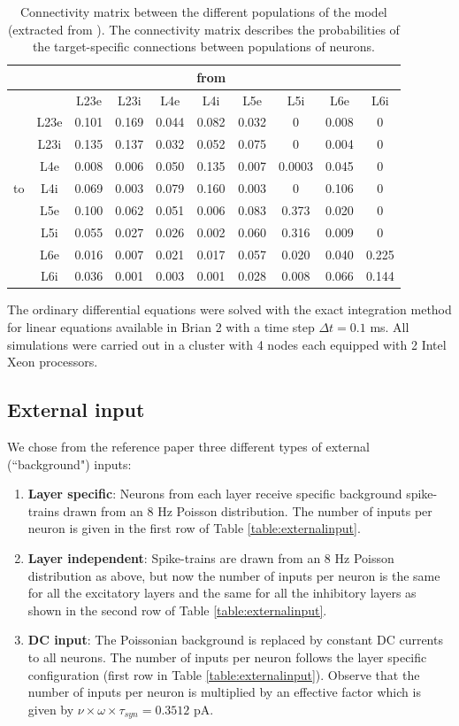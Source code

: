 \documentclass[10pt,a4paper,onecolumn]{article}
\begin{document}
\begin{table}[!ht]
\caption{\label{table:conectivity} Connectivity matrix between the different populations of the model (extracted from \cite{potjans2014}). The connectivity matrix describes the probabilities of the target-specific connections between populations of neurons.
}
\begin{center}
\begin{tabular}{lccccccccc}
 \toprule
 \midrule
 &  &  &  &  & from &  &  &  & \tabularnewline
  \midrule
 &  & L23e & L23i & L4e & L4i & L5e & L5i & L6e & L6i\tabularnewline
 \midrule
 & L23e & 0.101 & 0.169 & 0.044 & 0.082 & 0.032 & 0 & 0.008 & 0\tabularnewline
 & L23i & 0.135 & 0.137 & 0.032 & 0.052 & 0.075 & 0 & 0.004 & 0\tabularnewline
 & L4e & 0.008 & 0.006 & 0.050 & 0.135 & 0.007 & 0.0003 & 0.045 & 0\tabularnewline
 to & L4i & 0.069 & 0.003 & 0.079 & 0.160 & 0.003 & 0 & 0.106 & 0\tabularnewline
 & L5e & 0.100 & 0.062 & 0.051 & 0.006 & 0.083 & 0.373 & 0.020 & 0\tabularnewline
 & L5i & 0.055 & 0.027 & 0.026 & 0.002 & 0.060 & 0.316 & 0.009 & 0\tabularnewline
 & L6e & 0.016 & 0.007 & 0.021 & 0.017 & 0.057 & 0.020 & 0.040 & 0.225\tabularnewline
 & L6i & 0.036 & 0.001 & 0.003 & 0.001 & 0.028 & 0.008 & 0.066 & 0.144\tabularnewline
\bottomrule
\end{tabular}
\end{center}
\end{table}

The ordinary differential equations were solved with the exact integration method for linear equations available in Brian 2 with a time step $\Delta t=0.1$ ms. All simulations were carried out in a cluster with 4 nodes each equipped with 2 Intel Xeon processors. 

\subsection{External input}

We chose from the reference paper three different types of external (``background") inputs: 

\begin{enumerate}
\item \textbf{Layer specific}: Neurons from each layer receive specific background spike-trains drawn from an $8$ Hz Poisson distribution. The number of inputs per neuron is given in the first row of Table \ref{table:externalinput}.
\item \textbf{Layer independent}: Spike-trains are drawn from an $8$ Hz Poisson distribution as above, but now the number of inputs per neuron is the same for all the excitatory layers and the same for all the inhibitory layers as shown in the second row of Table \ref{table:externalinput}.
\item \textbf{DC input}: The Poissonian background is replaced by constant DC currents to all neurons. The number of inputs per neuron follows the layer specific configuration (first row in Table \ref{table:externalinput}). Observe that the number of inputs per neuron is multiplied by an effective factor which is given by $\nu \times \omega \times \tau_{syn}=0.3512$ pA. 
\end{enumerate}
\end{document}
